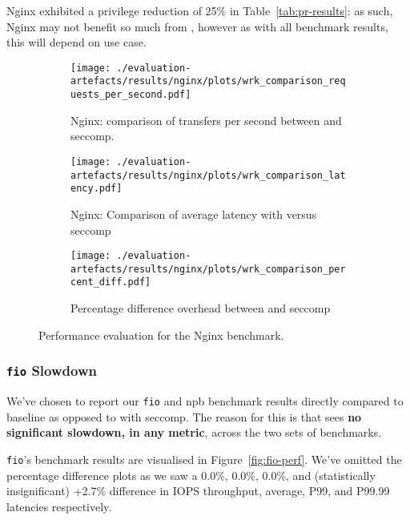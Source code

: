 Nginx exhibited a privilege reduction of 25\% in Table~\ref{tab:pr-results}: as
such, Nginx may not benefit so much from \af, however as with all benchmark
results, this will depend on use case.

\begin{figure}[htbp]
    \centering
    \begin{subfigure}[b]{0.75 \textwidth}
        \centering
        \texttt{[image: ./evaluation-artefacts/results/nginx/plots/wrk\_comparison\_requests\_per\_second.pdf]} 
        \caption{Nginx: comparison of transfers per second between \af and
        seccomp.}
        \label{fig:nginx-rps}
    \end{subfigure}
    \hfill
     \begin{subfigure}[b]{0.45 \textwidth}
        \centering
        \texttt{[image: ./evaluation-artefacts/results/nginx/plots/wrk\_comparison\_latency.pdf]} 
        \caption{Nginx: Comparison of average latency with \af versus
        seccomp}
        \label{fig:nginx-time}
    \end{subfigure}
     \medskip 
     \begin{subfigure}[b]{0.45 \textwidth}
        \centering
        \texttt{[image: ./evaluation-artefacts/results/nginx/plots/wrk\_comparison\_percent\_diff.pdf]} %
        \caption{Percentage difference overhead between \af and seccomp}
        \label{fig:nginx-percdiff}
    \end{subfigure}

    \caption{Performance evaluation for the Nginx benchmark.}
    \label{fig:nginx-perf}
\end{figure}

\subsubsection{\texttt{fio} Slowdown}\label{subsubsec:fio-slowdown}

We've chosen to report our \texttt{fio} and \ac{npb} benchmark results directly
compared to baseline as opposed to with seccomp. The reason for this is that \af
sees \textbf{no significant slowdown, in any metric}, across the two sets of
benchmarks. 

\texttt{fio}'s benchmark results are visualised in Figure~\ref{fig:fio-perf}.
We've omitted the percentage difference plots as we saw a 0.0\%, 0.0\%, 0.0\%, and
(statistically insignificant) +2.7\% difference in IOPS throughput, average,
P99, and P99.99 latencies respectively. 

